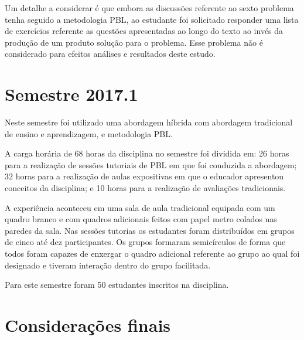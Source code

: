 Um detalhe a considerar é que embora as discussões referente ao sexto problema
tenha seguido a metodologia PBL, ao estudante foi solicitado responder
uma lista de exercícios referente as questões apresentadas ao longo
do texto ao invés da produção de um produto solução para o problema.
Esse problema não é considerado para efeitos análises e resultados
deste estudo.

\section{Semestre 2017.1}
Neste semestre foi utilizado uma abordagem híbrida com abordagem tradicional de ensino
e aprendizagem, e metodologia PBL.

A carga horária de 68 horas da disciplina no semestre foi dividida em:
26 horas para a realização de sessões tutoriais de PBL em que foi conduzida a abordagem;
32 horas para a realização de aulas expositivas em que o educador apresentou conceitos da disciplina;
e 10 horas para a realização de avaliações tradicionais.

A experiência aconteceu em uma sala de aula tradicional equipada com um
quadro branco e com quadros adicionais feitos com papel metro colados nas paredes da sala.
Nas sessões tutorias os estudantes foram distribuídos em grupos de cinco até dez participantes.
Os grupos formaram semicírculos de forma que todos foram capazes de
enxergar o quadro adicional referente ao grupo ao qual foi designado
e tiveram interação dentro do grupo facilitada.

Para este semestre foram 50 estudantes inscritos na disciplina.

\section{Considerações finais}
